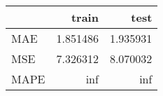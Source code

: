 \begin{tabular}{lrr}
\toprule
{} &     train &      test \\
\midrule
MAE  &  1.851486 &  1.935931 \\
MSE  &  7.326312 &  8.070032 \\
MAPE &       inf &       inf \\
\bottomrule
\end{tabular}
